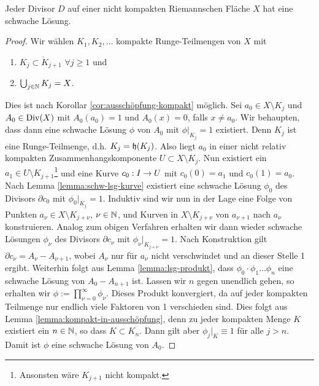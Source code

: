 \begin{lemma}
  \label{lemma:schwache-Lösung-Divisor}
  Jeder Divisor $D$ auf einer nicht kompakten Riemannschen Fläche $X$ hat eine
  schwache Lösung.
\end{lemma}

\begin{proof}
  Wir wählen $K_1, K_2, \dots$ kompakte Runge-Teilmengen von $X$ mit
  \begin{enumerate}
  \item $K_j \subset \mathring{K}_{j+1}$ $\forall j \geq 1$ und
  \item $\bigcup_{j \in \mathbb{N}} K_j = X$.
  \end{enumerate}
  Dies ist nach Korollar \ref{cor:ausschöpfung-kompakt} möglich.
  Sei $a_0 \in X \setminus K_j$ und $A_0 \in \operatorname{Div}(X)$
  mit $A_0(a_0) = 1$ und $A_0(x) = 0$, falls $x \neq a_0$. Wir
  behaupten, dass dann eine schwache Lösung $\phi$ von $A_0$ mit $\phi |_{K_j}
  = 1$ existiert. 
  Denn $K_j$ ist eine Runge-Teilmenge, d.h. $K_j = \mathfrak{h}(K_j)$. Also
  liegt $a_0$ in einer nicht relativ kompakten
  Zusammenhangskomponente $U \subset X \setminus K_j$.
  Nun existiert ein $a_1 \in U \setminus K_{j+1}$\footnote{Ansonsten wäre
  $K_{j+1}$ nicht kompakt.} und eine Kurve $c_0: I \rightarrow U$ mit
  $c_0(0)=a_1$ und $c_0(1) = a_0$. 
  Nach Lemma \ref{lemma:schw-lsg-kurve} existiert eine schwache Lösung
  $\phi_0$ des Divisors $\partial c_0$ mit $\phi_0|_{K_j} = 1$. 
  Induktiv sind wir nun in der Lage eine Folge von Punkten $a_\nu \in
  X \setminus K_{j+ \nu}$, $\nu \in \mathbb{N}$, und Kurven in $X \setminus
  K_{j+\nu}$ von $a_{\nu+1}$ nach $a_\nu$ konstruieren. Analog zum
  obigen Verfahren erhalten wir dann wieder schwache Lösungen
  $\phi_\nu$ des Divisors $\partial c_\nu$ mit $\phi_\nu |_{K_{j+\nu}}
  = 1$. 
  Nach Konstruktion gilt $\partial c_\nu = A_\nu - A_{\nu+1}$, wobei
  $A_\nu$ nur für $a_\nu$ nicht verschwindet und an dieser Stelle 1
  ergibt.
  Weiterhin folgt aus Lemma \ref{lemma:lsg-produkt}, dass $\phi_0 \cdot \phi_1 \dots \phi_n$ eine
  schwache Lösung von $A_0 - A_{n+1}$ ist.
  Lassen wir $n$ gegen unendlich gehen, so erhalten wir $\phi :=
  \prod_{\nu = 0}^\infty \phi_\nu$. Dieses Produkt konvergiert, da
  auf jeder kompakten Teilmenge nur endlich viele Faktoren von 1
  verschieden sind. Dies folgt aus Lemma
  \ref{lemma:kompakt-in-ausschöpfung}, denn zu jeder kompakten Menge
  $K$ existiert ein $n \in \mathbb{N}$, so dass $K \subset K_n$. Dann gilt
  aber $\phi_j |_K \equiv 1$ für alle $j > n$.
  Damit ist $\phi$ eine schwache Lösung von $A_0$.
  

\end{proof}
